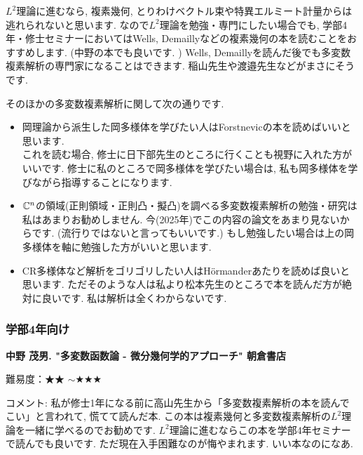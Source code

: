 $L^2$理論に進むなら, 複素幾何, とりわけベクトル束や特異エルミート計量からは逃れられないと思います. 
なので$L^2$理論を勉強・専門にしたい場合でも, 学部4年・修士セミナーにおいてはWells, Demaillyなどの複素幾何の本を読むことをおすすめします. (中野の本でも良いです. )
Wells, Demaillyを読んだ後でも多変数複素解析の専門家になることはできます. 稲山先生や渡邉先生などがまさにそうです. 

そのほかの多変数複素解析に関して次の通りです. 
\vspace{-8pt}
\begin{tcolorbox}[mybox]
\begin{itemize}[left=0pt]
  \setlength{\parskip}{0cm} %
  \setlength{\itemsep}{5pt} %
\item 岡理論から派生した岡多様体を学びたい人はForstnevicの本を読めばいいと思います.  \\ これを読む場合, 修士に日下部先生のところに行くことも視野に入れた方がいいです. 修士に私のところで岡多様体を学びたい場合は, 私も岡多様体を学びながら指導することになります. 
\item $\mathbb{C}^n$の領域(正則領域・正則凸・擬凸)を調べる多変数複素解析の勉強・研究は私はあまりお勧めしません. 今(2025年)でこの内容の論文をあまり見ないからです. (流行りではないと言ってもいいです.) もし勉強したい場合は上の岡多様体を軸に勉強した方がいいと思います. 
\item CR多様体など解析をゴリゴリしたい人はH\"ormanderあたりを読めば良いと思います. ただそのような人は私より松本先生のところで本を読んだ方が絶対に良いです. 私は解析は全くわからないです. 
\end{itemize}
\end{tcolorbox}


\subsubsection{学部4年向け}

\textbf{中野 茂男. "多変数函数論 - 微分幾何学的アプローチ" 朝倉書店}  　\vspace{-6pt} 

難易度：★★ $\sim$★★★ 　\vspace{-6pt} 

コメント: 私が修士1年になる前に高山先生から「多変数複素解析の本を読んでこい」と言われて, 慌てて読んだ本. この本は複素幾何と多変数複素解析の$L^2$理論を一緒に学べるのでお勧めです. $L^2$理論に進むならこの本を学部4年セミナーで読んでも良いです. ただ現在入手困難なのが悔やまれます. いい本なのになあ. 

